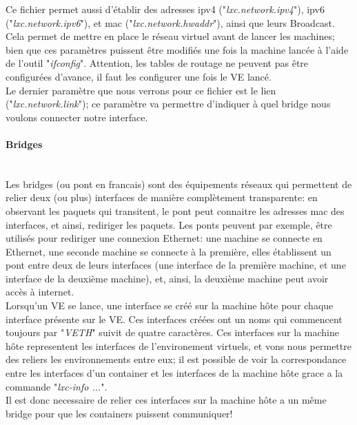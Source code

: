 Ce fichier permet aussi d'\'etablir des adresses ipv4 ("\emph{lxc.network.ipv4}"), ipv6 ("\emph{lxc.network.ipv6}"),
et mac ("\emph{lxc.network.hwaddr}"), ainsi que leurs Broadcast. Cela permet de mettre en place le r\'eseau 
virtuel avant de lancer les machines; bien que ces param\`etres puissent \^etre modifi\'es une fois la machine
lanc\'ee \`a l'aide de l'outil "\emph{ifconfig}". Attention, les tables de routage ne peuvent pas \^etre
configur\'ees d'avance, il faut les configurer une fois le VE lanc\'e.\\

Le dernier param\`etre que nous verrons pour ce fichier est le lien ("\emph{lxc.network.link}"); ce param\`etre
va permettre d'indiquer \`a quel bridge nous voulons connecter notre interface.\\


\paragraph{Bridges}~\\

Les bridges (ou pont en francais) sont des \'equipements r\'eseaux qui permettent de relier deux (ou plus)
interfaces de mani\`ere compl\`etement transparente: en observant les paquets qui transitent, le pont peut 
connaitre les adresses mac des interfaces, et ainsi, rediriger les paquets. Les ponts peuvent par exemple,
\^etre utilis\'es pour rediriger une connexion Ethernet: une machine se connecte en Ethernet, une seconde 
machine se connecte \`a la premi\`ere, elles \'etablissent un pont entre deux de leurs interfaces (une interface
de la premi\`ere machine, et une interface de la deuxi\`eme machine), et, ainsi, la deuxi\`eme machine peut 
avoir acc\`es \`a internet.\\

Lorsqu'un VE se lance, une interface se cr\'e\'e sur la machine h\^ote pour chaque interface pr\'esente sur le VE.
Ces interfaces cr\'e\'ees ont un noms qui commencent toujours par "\emph{VETH}" suivit de quatre caract\`eres. Ces
interfaces sur la machine h\^ote representent les interfaces de l'environement virtuels, et vons nous permettre des
reliers les environnements entre eux; il est possible de voir la correspondance entre les interfaces d'un container
et les interfaces de la machine h\^ote grace a la commande "\emph{lxc-info ...}".\\

Il est donc necessaire de relier ces interfaces sur la machine h\^ote a un m\^eme bridge pour que les 
containers puissent communiquer!
